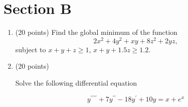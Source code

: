 \documentclass[12pt]{article} %
\theoremstyle{definition} %
\begin{document}
\section*{Section B}


\begin{enumerate}[resume]
\item (20 points) Find the global minimum of the function 
\[
    2x^2 + 4y^2 + xy + 8z^2 + 2yz,
\]
subject to $x + y + z \geq 1$, $x + y + 1.5z \geq 1.2$.


\item (20 points)

Solve the following differential equation 

\[
y^{\prime\prime\prime\prime} + 7 y^{\prime\prime} - 18y^{\prime} + 10y = x + e^x 
\]


\end{enumerate}
\end{document}
